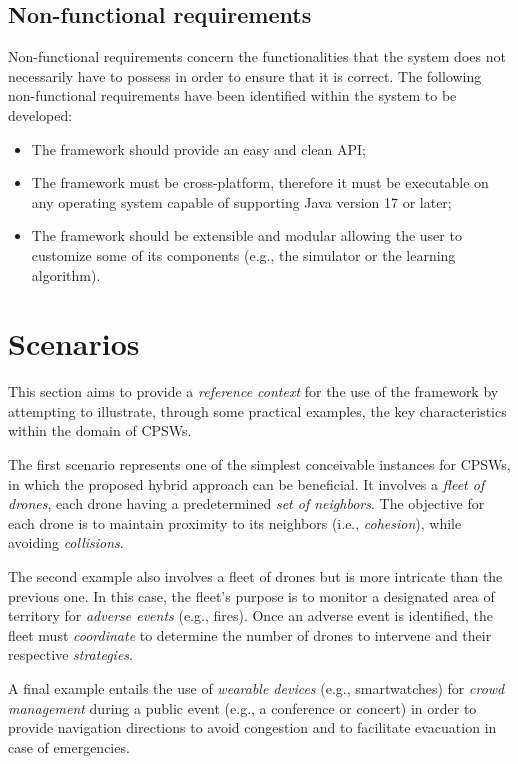 \documentclass[12pt,a4paper,openright,twoside]{book}
\begin{document}
\subsection*{Non-functional requirements}
Non-functional requirements concern the functionalities that the system does not necessarily have to possess in order to ensure that it is correct.
The following non-functional requirements have been identified within the system to be developed:
\begin{itemize}
    \item The framework should provide an easy and clean API;
    \item The framework must be cross-platform, therefore it must be executable on any operating 
        system capable of supporting Java version 17 or later;
    \item The framework should be extensible and modular allowing the user to customize some of its 
        components (e.g., the simulator or the learning algorithm).
\end{itemize}

\section{Scenarios}

This section aims to provide a \emph{reference context} for the use of the framework by attempting to illustrate, 
    through some practical examples, the key characteristics within the domain of CPSWs.

The first scenario represents one of the simplest conceivable instances for CPSWs, in which the proposed hybrid 
    approach can be beneficial. It involves a \emph{fleet of drones}, each drone having a predetermined \emph{set of neighbors}. 
    The objective for each drone is to maintain proximity to its neighbors (i.e., \emph{cohesion}), while avoiding \emph{collisions}.

The second example also involves a fleet of drones but is more intricate than the previous one. In this case, 
    the fleet's purpose is to monitor a designated area of territory for \emph{adverse events} (e.g., fires). Once an adverse 
    event is identified, the fleet must \emph{coordinate} to determine the number of drones to intervene and their 
    respective \emph{strategies}.

A final example entails the use of \emph{wearable devices} (e.g., smartwatches) for \emph{crowd management} during a public event 
    (e.g., a conference or concert) in order to provide navigation directions to avoid congestion and to facilitate 
    evacuation in case of emergencies.
\end{document}
